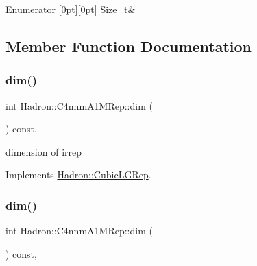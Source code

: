 \begin{DoxyEnumFields}{Enumerator}
[0pt][0pt]{}\mbox{\label{structHadron_1_1C4nnmA1MRep_a03f6f10e06e2ac2047a12f761f504299a96418fe36fd164a16e23cd97ddd4f4e3}} 
Size\+\_\+t&\\
\hline

\end{DoxyEnumFields}


\subsection{Member Function Documentation}
\mbox{\label{structHadron_1_1C4nnmA1MRep_afb797b4baebc8d261c96fd1f173825b6}} 
\subsubsection{\texorpdfstring{dim()}{dim()}\hspace{0.1cm}{\footnotesize\ttfamily [1/3]}}
{\footnotesize\ttfamily int Hadron\+::\+C4nnm\+A1\+M\+Rep\+::dim (\begin{DoxyParamCaption}{ }\end{DoxyParamCaption}) const\hspace{0.3cm}{\ttfamily [inline]}, {\ttfamily [virtual]}}

dimension of irrep 

Implements \mbox{\hyperlink{structHadron_1_1CubicLGRep_a3acbaea26503ed64f20df693a48e4cdd}{Hadron\+::\+Cubic\+L\+G\+Rep}}.

\mbox{\label{structHadron_1_1C4nnmA1MRep_afb797b4baebc8d261c96fd1f173825b6}} 
\subsubsection{\texorpdfstring{dim()}{dim()}\hspace{0.1cm}{\footnotesize\ttfamily [2/3]}}
{\footnotesize\ttfamily int Hadron\+::\+C4nnm\+A1\+M\+Rep\+::dim (\begin{DoxyParamCaption}{ }\end{DoxyParamCaption}) const\hspace{0.3cm}{\ttfamily [inline]}, {\ttfamily [virtual]}}


